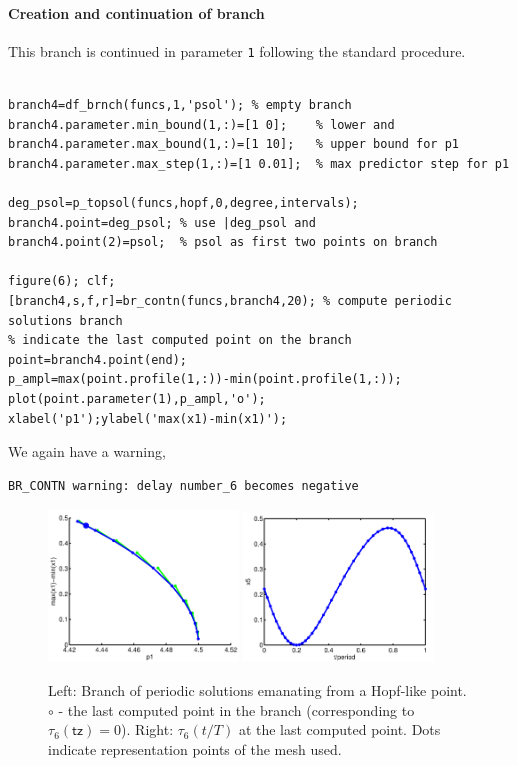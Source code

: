 \documentclass[10pt]{scrartcl}
\newcommand{\parm}[1]{\mathsf{#1}}
\newcommand{\blist}[1]{\mbox{\lstinline!#1!}}
\begin{document}
\paragraph{Creation and continuation of branch}
This branch is continued in parameter \blist{1} following the standard procedure.
\begin{lstlisting}

branch4=df_brnch(funcs,1,'psol'); % empty branch
branch4.parameter.min_bound(1,:)=[1 0];    % lower and
branch4.parameter.max_bound(1,:)=[1 10];   % upper bound for p1
branch4.parameter.max_step(1,:)=[1 0.01];  % max predictor step for p1

deg_psol=p_topsol(funcs,hopf,0,degree,intervals);
branch4.point=deg_psol; % use |deg_psol and
branch4.point(2)=psol;  % psol as first two points on branch

figure(6); clf;
[branch4,s,f,r]=br_contn(funcs,branch4,20); % compute periodic solutions branch
% indicate the last computed point on the branch
point=branch4.point(end);
p_ampl=max(point.profile(1,:))-min(point.profile(1,:));
plot(point.parameter(1),p_ampl,'o');
xlabel('p1');ylabel('max(x1)-min(x1)');
\end{lstlisting}
\noindent We again have a warning,
{\small
\begin{verbatim}
BR_CONTN warning: delay number_6 becomes negative
\end{verbatim}}
  \begin{figure}[h]
    \begin{center}
      \includegraphics[width=0.45\textwidth]{fig/sdd6}
      \includegraphics[width=0.45\textwidth]{fig/sdd7}
    \end{center}
    \caption{\label{br_ps_sd2}Left: Branch of periodic solutions emanating
      from a Hopf-like point. $\circ$ - the last computed point in the branch
      (corresponding to $\tau_6(\parm{tz})=0$). Right: $\tau_6(t/T)$ at 
      the last computed point. Dots indicate representation points
      of the mesh used.}
  \end{figure}
\end{document}
